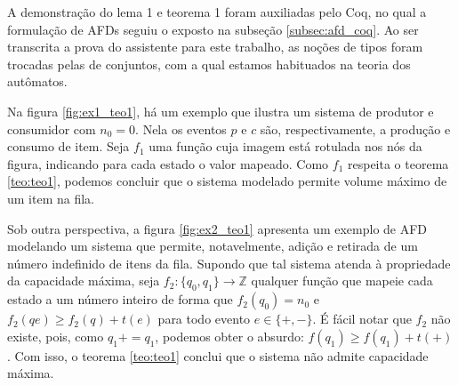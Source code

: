 A demonstração do lema 1 e teorema 1 foram auxiliadas pelo Coq, no qual a formulação de AFDs seguiu o exposto na subseção \ref{subsec:afd_coq}. Ao ser transcrita a prova do assistente para este trabalho, as noções de tipos foram trocadas pelas de conjuntos, com a qual estamos habituados na teoria dos autômatos.

Na figura \ref{fig:ex1_teo1}, há um exemplo que ilustra um sistema de produtor e consumidor com $n_0 = 0$. Nela os eventos $p$ e $c$ são, respectivamente, a produção e consumo de item. Seja $f_1$ uma função cuja imagem está rotulada nos nós da figura, indicando para cada estado o valor mapeado. Como $f_1$ respeita o teorema \ref{teo:teo1}, podemos concluir que o sistema modelado permite volume máximo de um item na fila.


Sob outra perspectiva, a figura \ref{fig:ex2_teo1} apresenta um exemplo de AFD modelando um sistema que permite, notavelmente, adição e retirada de um número indefinido de itens da fila. Supondo que tal sistema atenda à propriedade da capacidade máxima, seja $f_2 : \{ q_0, q_1 \} \to \mathbb{Z}$ qualquer função que mapeie cada estado a um número inteiro de forma que $f_2(q_0) = n_0$ e $f_2(qe) \geq f_2(q) + t(e)$ para todo evento $e \in \{+,-\}$. É fácil notar que $f_2$ não existe, pois, como $q_1+ = q_1$, podemos obter o absurdo: $f(q_1) \geq f(q_1) + t(+)$. Com isso, o teorema \ref{teo:teo1} conclui que o sistema não admite capacidade máxima.


